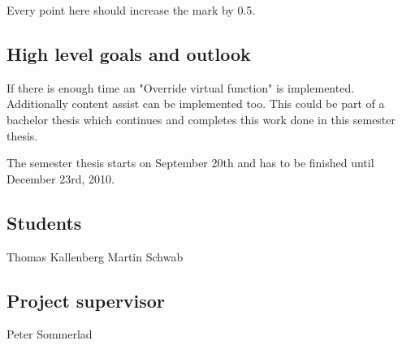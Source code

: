 \documentclass[a4paper,10pt]{scrreprt}
\begin{document}
Every point here should increase the mark by 0.5.

\subsection*{High level goals and outlook}

If there is enough time an "Override virtual function" is implemented.
Additionally content assist can be implemented too. This could be part of a
bachelor thesis which continues and completes this work done in this semester
thesis.

The semester thesis starts on September 20th and has to be finished until
December 23rd, 2010.

\subsection*{Students}
Thomas Kallenberg \dotfill
Martin Schwab \dotfill
\subsection*{Project supervisor}
Peter Sommerlad \dotfill
~ \newline 
\end{document}
